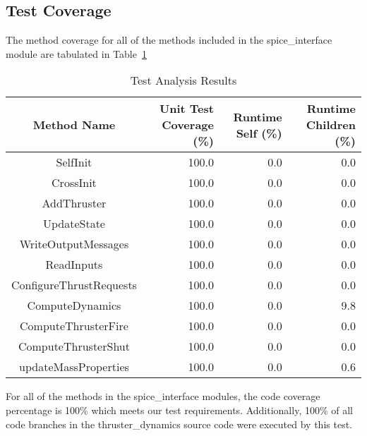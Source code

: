 \subsection{Test Coverage}
The method coverage for all of the methods included in the spice\_interface 
module are tabulated in Table~\ref{tab:cov_met}

\begin{table}[htbp]
    \caption{Test Analysis Results}
   \label{tab:cov_met}
        \centering \fontsize{10}{10}\selectfont
   \begin{tabular}{c | r | r | r} %
      \hline
      Method Name    & Unit Test Coverage (\%) & Runtime Self (\%) & Runtime Children (\%) \\
      \hline
      SelfInit & 100.0 & 0.0 & 0.0 \\
      CrossInit & 100.0 & 0.0 & 0.0 \\
      AddThruster & 100.0 & 0.0 & 0.0 \\
      UpdateState & 100.0 & 0.0 & 0.0 \\
      WriteOutputMessages & 100.0 & 0.0 & 0.0 \\
      ReadInputs & 100.0 & 0.0 & 0.0 \\
      ConfigureThrustRequests & 100.0 & 0.0 & 0.0 \\
      ComputeDynamics & 100.0 & 0.0 & 9.8 \\
      ComputeThrusterFire & 100.0 & 0.0 & 0.0 \\
      ComputeThrusterShut & 100.0 & 0.0 & 0.0 \\
      updateMassProperties & 100.0 & 0.0 & 0.6 \\
      \hline
   \end{tabular}
\end{table}

For all of the methods in the spice\_interface modules, the code coverage 
percentage is 100\% which meets our test requirements.  Additionally, 100\% of 
all code branches in the thruster\_dynamics source code were executed by this 
test.


